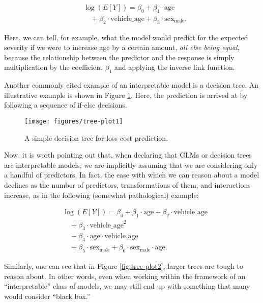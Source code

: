\documentclass[preprint, 3p, twocolumn, letterpaper, 10pt]{elsarticle} %
\begin{document}
\begin{align}
& \log(E[Y]) = \beta_0 + \beta_1 \cdot \text{age} \nonumber \\
& \quad + \beta_2 \cdot \text{vehicle\_age} + \beta_3 \cdot \text{sex}_{\text{male}}.
\end{align}

Here, we can tell, for example, what the model would predict for the expected
severity if we were to increase age by a certain amount, \emph{all else being equal},
because the relationship between the predictor and the response is simply
multiplication by the coefficient \(\beta_1\) and applying the inverse link
function.

Another commonly cited example of an interpretable model is a decision tree. An
illustrative example is shown in Figure \ref{fig:tree-plot1}. Here, the
prediction is arrived at by following a sequence of if-else decisions.

\begin{figure}

{\centering \texttt{[image: figures/tree-plot1]} 

}

\caption{A simple decision tree for loss cost prediction.}\label{fig:tree-plot1}
\end{figure}

Now, it is worth pointing out that, when declaring that GLMs or decision trees
are interpretable models, we are implicitly assuming that we are considering
only a handful of predictors. In fact, the ease with which we can reason about a
model declines as the number of predictors, transformations of them, and
interactions increase, as in the following (somewhat pathological) example:

\begin{align}\label{eq:badglm}
& \log(E[Y]) = \beta_0 + \beta_1 \cdot \text{age} + \beta_2 \cdot \text{vehicle\_age} \nonumber\\
& \quad + \beta_3\cdot\text{vehicle\_age}^2 \nonumber \\
& \quad + \beta_4 \cdot \text{age} \cdot \text{vehicle\_age} \nonumber \\
& \quad + \beta_5 \cdot \text{sex}_{\text{male}} + \beta_6 \cdot \text{sex}_{\text{male}} \cdot \text{age}. 
\end{align}

Similarly, one can see that in Figure \ref{fig:tree-plot2}, larger trees are
tough to reason about. In other words, even when working within the framework
of an ``interpretable'' class of models, we may still end up with something that
many would consider ``black box.''
\end{document}
